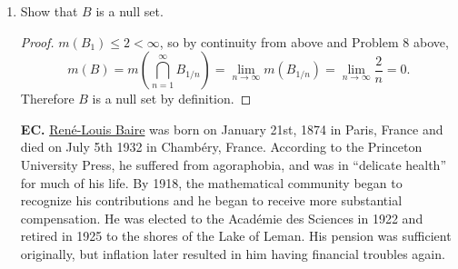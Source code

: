 \documentclass[11pt,oneside,english]{amsart}
\theoremstyle{definition}
\newtheorem*{lemma}{Lemma}
\newcommand{\lom}[2]{\lim_{{#1}\rightarrow{#2}}}
\newcommand{\MB}[1]{\mathbb{#1}}
\begin{document}
\begin{enumerate}
\begin{proof}
$B$ is a countable intersection of open dense sets in $\MB{R}$ so $\MB{R}-B$ is a countable union of closed nowhere dense sets by DeMorgan's laws and Problem 3 above, i.e. $\MB{R}-B$ is meager. This means that $B$ is comeager, so by the Lemma\footnote{\begin{lemma}
A subset $S\subseteq \MB{R}$ cannot be simultaneously meager and comeager.
\end{lemma}

\begin{proof}
Let $S\subseteq \MB{R}$ and suppose $S$ is meager and comeager. Then $S$ is a countable union of nowhere dense sets, but so is $\MB{R}-S$. Thus $S\cup(\MB{R}-S)=\MB{R}$ is a countable union of nowhere dense sets and so is meager by definition. But this contradicts the second conclusion in the Baire Category Theorem since $\MB{R}$ is complete. Thus $S$ cannot be simultaneously meager and comeager.
\end{proof}} below, it is not meager.
\end{proof}

\item Show that $B$ is a null set.

\begin{proof}
$m(B_1)\leq2<\infty$, so by continuity from above and Problem 8 above,
\[
m(B)=m\left(\bigcap_{n = 1}^\infty B_{1/n}\right)=\lom{n}{\infty}m(B_{1/n})=\lom{n}{\infty}\frac{2}{n}=0.
\]
Therefore $B$ is a null set by definition.
\end{proof}


\item[\textbf{EC.}] \href{http://mathshistory.st-andrews.ac.uk/Biographies/Baire.html}{Ren\'{e}-Louis Baire} was born on January 21st, 1874 in Paris, France and died on July 5th 1932 in Chamb\'{e}ry, France. According to the Princeton University Press, he suffered from agoraphobia, and was in ``delicate health'' for much of his life. By 1918, the mathematical community began to recognize his contributions and he began to receive more substantial compensation. He was elected to the Acad\'{e}mie des Sciences in 1922 and retired in 1925 to the shores of the Lake of Leman. His pension was sufficient originally, but inflation later resulted in him having financial troubles again.
\end{enumerate}

\vfill
\end{document}

